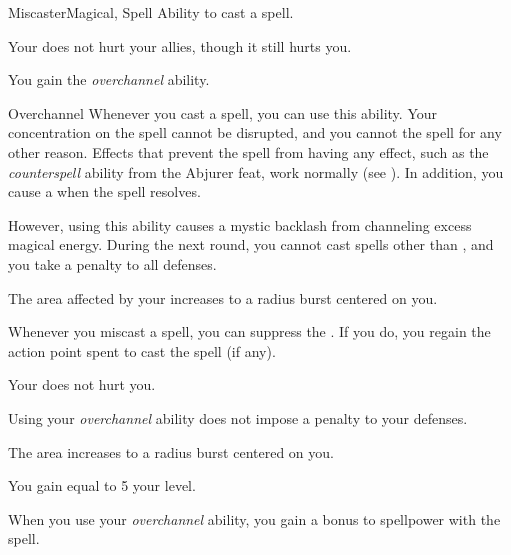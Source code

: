     \begin{feat}{Miscaster}{Magical, Spell}
        \featpre Ability to cast a spell.

         Your  does not hurt your allies, though it still hurts you.

         You gain the \textit{overchannel} ability.
        \begin{ability}{Overchannel}
            Whenever you cast a spell, you can use this ability.
            Your concentration on the spell cannot be disrupted, and you cannot  the spell for any other reason.
            Effects that prevent the spell from having any effect, such as the \textit{counterspell} ability from the Abjurer feat, work normally (see ).
            In addition, you cause a  when the spell resolves.

            However, using this ability causes a mystic backlash from channeling excess magical energy.
            During the next round, you cannot cast spells other than , and you take a  penalty to all defenses.
        \end{ability}

         The area affected by your  increases to a \areasmall radius burst centered on you.

         Whenever you miscast a spell, you can suppress the .
        If you do, you regain the action point spent to cast the spell (if any).

         Your  does not hurt you.

         Using your \textit{overchannel} ability does not impose a penalty to your defenses.

         The area increases to a \areamed radius burst centered on you.

         You gain  equal to 5 \add your level.

         When you use your \textit{overchannel} ability, you gain a  bonus to spellpower with the spell.
    \end{feat}

